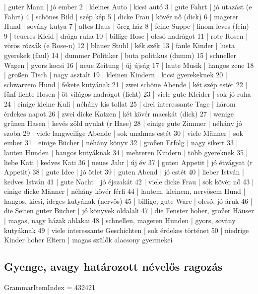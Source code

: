 \documentclass{article}
\newenvironment{exmp}{\verbatim}{\endverbatim}
\begin{document}
\begin{exmp}
1 | guter Mann | jó ember
2 | kleines Auto | kicsi autó
3 | gute Fahrt | jó utazást (e Fahrt)
4 | schönes Bild | szép kép
5 | dicke Frau | kövér nő (dick)
6 | magerer Hund | sovány kutya
7 | altes Haus | öreg ház
8 | feine Suppe | finom leves (fein)
9 | teueres Kleid | drága ruha
10 | billige Hose | olcsó nadrágot
11 | rote Rosen | vörös rózsák (e Rose-n)
12 | blauer Stuhl | kék szék
13 | faule Kinder | lusta gyerekek (faul)
14 | dummer Politiker | buta politikus (dumm)
15 | schneller Wagen | gyors kocsi
16 | neue Zeitung | új újság
17 | laute Musik | hangos zene
18 | großen Tisch | nagy asztalt
19 | kleinen Kindern | kicsi gyerekeknek
20 | schwarzem Hund | fekete kutyának
21 | zwei schöne Abende | két szép estét
22 | fünf lichte Hosen | öt világos nadrágot (licht)
23 | viele gute Kleider | sok jó ruha
24 | einige kleine Kuli | néhány kis tollat
25 | drei interessante Tage | három érdekes napot
26 | zwei dicke Katzen | két kövér macskát (dick)
27 | wenige grünen Hasen | kevés zöld nyulat (r Hase)
28 | einige gute Zimmer | néhány jó szoba
29 | viele langweilige Abende | sok unalmas estét
30 | viele Männer | sok ember
31 | einige Bücher | néhány könyv
32 | großen Erfolg | nagy sikert
33 | lauten Hunden | hangos kutyáknak
34 | mehreren Kindern | több gyereknek
35 | liebe Kati | kedves Kati
36 | neues Jahr | új év
37 | guten Appetit | jó étvágyat (r Appetit)
38 | gute Idee | jó ötlet
39 | guten Abend | jó estét
40 | lieber István | kedves István
41 | gute Nacht | jó éjszakát
42 | viele dicke Frau | sok kövér nő
43 | einige dicke Männer | néhány kövér férfi 
44 | lautem, kleinem, nervösem Hund | hangos, kicsi, ideges kutyának (nervös)
45 | billige, gute Ware | olcsó, jó áruk
46 | die Seiten guter Bücher | jó könyvek oldalali
47 | die Fenster hoher, großer Häuser | magas, nagy házak ablakai
48 | schnellen, mageren Hunden | gyors, sovány kutyáknak
49 | viele interessante Geschichten | sok érdekes történet
50 | niedrige Kinder hoher Eltern | magas szülők alacsony gyermekei
\end{exmp}

\subsection{Gyenge, avagy határozott névelős ragozás}

GrammarItemIndex = 432421
\end{document}
